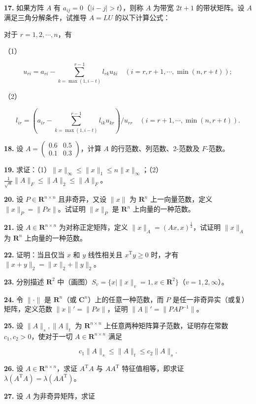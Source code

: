 \documentclass[
  10pt,
  fontset=fandol]{ctexart}
\begin{document}
\textbf{17.} 如果方阵 \(A\) 有 \(a_{ij}=0\)（\(|i-j|>t\)），则称 \(A\)
为带宽 \(2t+1\) 的带状矩阵。设 \(A\) 满足三角分解条件，试推导 \(A=LU\)
的以下计算公式：

对于 \(r=1,2,\cdots,n\)，有

（1）

\[
u_{ri}=a_{ri}-\sum_{k=\max(1,i-t)}^{r-1}l_{rk}u_{ki}\quad(i=r,r+1,\cdots,\min(n,r+t));
\]

（2）

\[
l_{ir}=\left(a_{ir}-\sum_{k=\max(1,i-t)}^{r-1}l_{ik}u_{kr}\right)/u_{rr}\quad(i=r+1,\cdots,\min(n,r+t)).
\]

\textbf{18.} 设 \(A=\begin{pmatrix}0.6&0.5\\0.1&0.3\end{pmatrix}\)，计算
\(A\) 的行范数、列范数、2-范数及 \(F\)-范数。

\textbf{19.}
求证：（1）\(\|x\|_\infty\leqslant\|x\|_1\leqslant n\|x\|_\infty\)；（2）\(\frac1{\sqrt n}\|A\|_F\leqslant\|A\|_2\leqslant\|A\|_F\)。

\textbf{20.} 设 \(P\in\mathbf R^{n\times n}\) 且非奇异，又设 \(\|x\|\)
为 \(\mathbf R^n\) 上一向量范数，定义 \(\|x\|_P=\|Px\|\)。试证明
\(\|x\|_P\) 是 \(\mathbf R^n\) 上向量的一种范数。

\textbf{21.} 设 \(A\in\mathbf R^{n\times n}\) 为对称正定矩阵，定义
\(\|x\|_A=(Ax,x)^{\frac12}\)，试证明 \(\|x\|_A\) 为 \(\mathbf R^n\)
上向量的一种范数。

\textbf{22.} 证明：当且仅当 \(x\) 和 \(y\) 线性相关且
\(x^{\mathrm T}y\geqslant0\) 时，才有 \(\|x+y\|_2=\|x\|_2+\|y\|_2\)。

\textbf{23.} 分别描述 \(\mathbf R^2\)
中（画图）\(S_v=\{x\mid\|x\|_v=1,x\in\mathbf R^2\}\)（\(v=1,2,\infty\)）。

\textbf{24.} 令 \(\|\cdot\|\) 是 \(\mathbf R^n\)（或
\(\mathbf C^n\)）上的任意一种范数，而 \(P\)
是任一非奇异实（或复）矩阵，定义范数 \(\|x\|'=\|Px\|\)，证明
\(\|A\|'=\|PAP^{-1}\|\)。

\textbf{25.} 设 \(\|A\|_s,\|A\|_t\) 为 \(\mathbf R^{n\times n}\)
上任意两种矩阵算子范数，证明存在常数 \(c_1,c_2>0\)，使对于一切
\(A\in\mathbf R^{n\times n}\) 满足

\[
c_1\|A\|_s\leqslant\|A\|_t\leqslant c_2\|A\|_s.
\]

\textbf{26.} 设 \(A\in\mathbf R^{n\times n}\)，求证 \(A^{\mathrm T}A\)
与 \(AA^{\mathrm T}\) 特征值相等，即求证
\(\lambda(A^{\mathrm T}A)=\lambda(AA^{\mathrm T})\)。

\textbf{27.} 设 \(A\) 为非奇异矩阵，求证
\end{document}
